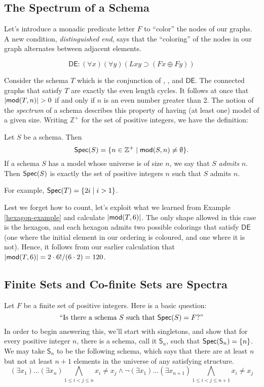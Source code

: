 \subsection{The Spectrum of a Schema}
Let's introduce a monadic predicate letter $F$ to ``color'' the nodes of our graphs. A new condition, \emph{distinguished end}, says that the ``coloring'' of the nodes in our graph alternates between adjacent elements. 

\[
  \mathsf{DE}: (\forall x)(\forall y)(Lxy\supset (Fx\oplus Fy))  
\]

Consider the schema $T$ which is the conjunction of \sg, \twor, and $\mathsf{DE}$. The connected graphs that satisfy $T$ are exactly the even length cycles. It follows at once that $\mbox{$|\mbox{$\mathsf{mod}(T,n)$}|$}>0$ if and only if $n$ is an even number greater than 2. The notion of the \emph{spectrum} of a schema describes this property of having (at least one) model of a given size. Writing $\mathbb{Z}^+$ for the set of positive integers, we have the definition:


\begin{definition}
Let $S$ be a schema. Then 
\[
\mbox{$\mathsf{Spec}(S)$}=\{n\in \mathbb{Z}^+\mid \mbox{$\mathsf{mod}(S,n)$}\neq\emptyset\}.
\]
If a schema $S$ has a model whose universe is of %
size $n$, we say that $S$ \emph{admits} $n$. Then $\mbox{$\mathsf{Spec}(S)$}$ is exactly the set of positive integers $n$ such that $S$ admits $n$.
\end{definition}

For example, $\mbox{$\mathsf{Spec}(T)$}=\{2i\mid i>1\}$.
\begin{example}
Lest we forget how to count, let's exploit what we learned from Example \ref{hexagon-example} and calculate $\mbox{$|\mbox{$\mathsf{mod}(T,6)$}|$}$. The only shape allowed in this case is the hexagon, and each hexagon admits two possible colorings that satisfy $\mathsf{DE}$ (one where the initial element in our ordering is coloured, and one where it is not). Hence, it follows from our earlier calculation that $\mbox{$|\mbox{$\mathsf{mod}(T,6)$}|$}=2\cdot6!/(6\cdot2)=120$.
\end{example}
 
\subsection*{Finite Sets and Co-finite Sets are Spectra}

Let $F$ be a finite set of positive integers. Here is a basic question: 
\[
\mbox{``Is there a schema $S$ such that $\mbox{$\mathsf{Spec}(S)$}=F$?''}
\]
 In order to begin answering this, we'll start with singletons, and show that for every positive integer $n$, there is a schema, call it $\mathsf{S}_n$,  such that $\mbox{$\mathsf{Spec}(\mathsf{S}_n)$}=\{n\}$. We may take $\mathsf{S}_n$ to be the following schema, which says that there are at least $n$ but not at least $n + 1$ elements in the universe of any satisfying structure. 
\[
(\exists x_1)\ldots(\exists x_n)\bigwedge_{1\leq i<j\leq n}x_i\neq x_j\wedge \neg(\exists x_1)\ldots(\exists x_{n+1})\bigwedge_{1\leq i<j\leq n+1}x_i\neq x_j
\]

